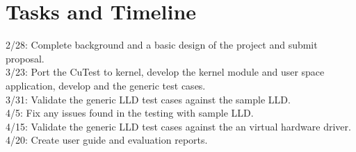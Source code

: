 
\section{Tasks and Timeline}\vspace{3 mm}


  \par 2/28:  Complete background and a basic design of the project and submit proposal. \\

3/23:  Port the CuTest to kernel, develop the kernel module and user space application, develop and the generic test cases. \\

3/31:  Validate the generic LLD test cases against the sample LLD. \\

4/5:  Fix any issues found in the testing with sample LLD. \\

4/15: Validate the generic LLD test cases against the an virtual hardware driver. \\

4/20:  Create user guide and evaluation reports. \\
